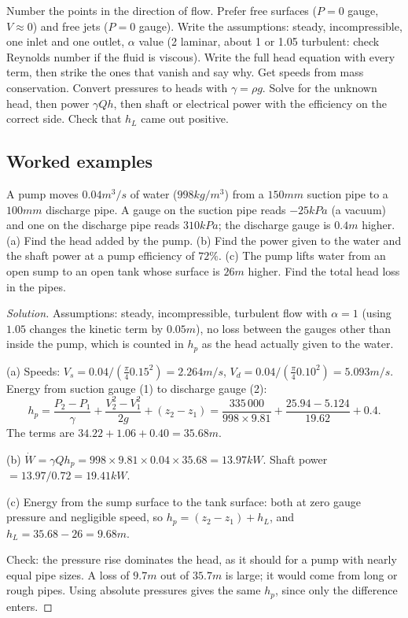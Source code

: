\begin{firstmoves}
Number the points in the direction of flow. Prefer free surfaces ($P = 0$ gauge, $V\approx0$) and free jets ($P = 0$ gauge). Write the assumptions: steady, incompressible, one inlet and one outlet, $\alpha$ value (2 laminar, about 1 or 1.05 turbulent: check Reynolds number if the fluid is viscous). Write the full head equation with every term, then strike the ones that vanish and say why. Get speeds from mass conservation. Convert pressures to heads with $\gamma = \rho g$. Solve for the unknown head, then power $\gamma Qh$, then shaft or electrical power with the efficiency on the correct side. Check that $h_L$ came out positive.
\end{firstmoves}

\subsection*{Worked examples}

\begin{example}
A pump moves $0.04\unit{m^3/s}$ of water ($998\unit{kg/m^3}$) from a $150\unit{mm}$ suction pipe to a $100\unit{mm}$ discharge pipe. A gauge on the suction pipe reads $-25\unit{kPa}$ (a vacuum) and one on the discharge pipe reads $310\unit{kPa}$; the discharge gauge is $0.4\unit{m}$ higher. (a) Find the head added by the pump. (b) Find the power given to the water and the shaft power at a pump efficiency of $72\%$. (c) The pump lifts water from an open sump to an open tank whose surface is $26\unit{m}$ higher. Find the total head loss in the pipes.
\end{example}

\begin{proof}[Solution]
Assumptions: steady, incompressible, turbulent flow with $\alpha = 1$ (using $1.05$ changes the kinetic term by $0.05\unit{m}$), no loss between the gauges other than inside the pump, which is counted in $h_p$ as the head actually given to the water.

(a) Speeds: $V_s = 0.04/(\tfrac{\pi}{4}0.15^2) = 2.264\unit{m/s}$, $V_d = 0.04/(\tfrac{\pi}{4}0.10^2) = 5.093\unit{m/s}$. Energy from suction gauge (1) to discharge gauge (2):
\[
h_p = \frac{P_2 - P_1}{\gamma} + \frac{V_2^2 - V_1^2}{2g} + (z_2 - z_1) = \frac{335\,000}{998\times9.81} + \frac{25.94 - 5.124}{19.62} + 0.4 .
\]
The terms are $34.22 + 1.06 + 0.40 = 35.68\unit{m}$.

(b) $\dot W = \gamma Qh_p = 998\times9.81\times0.04\times35.68 = 13.97\unit{kW}$. Shaft power $= 13.97/0.72 = 19.41\unit{kW}$.

(c) Energy from the sump surface to the tank surface: both at zero gauge pressure and negligible speed, so $h_p = (z_2 - z_1) + h_L$, and $h_L = 35.68 - 26 = 9.68\unit{m}$.

Check: the pressure rise dominates the head, as it should for a pump with nearly equal pipe sizes. A loss of $9.7\unit{m}$ out of $35.7\unit{m}$ is large; it would come from long or rough pipes. Using absolute pressures gives the same $h_p$, since only the difference enters.
\end{proof}

